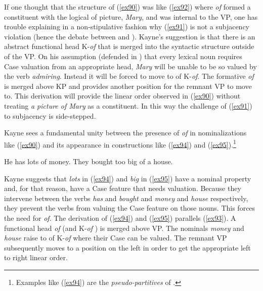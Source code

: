 \documentclass[output=paper,
modfonts
]{LSP/langsci}
\begin{document}
If one thought that the structure of ({\ref{ex90}}) was like ({\ref{ex92}}) where {\textit{of}} formed a constituent with the logical  of picture, {\textit{Mary}}, and was internal to the VP, one has trouble explaining in a non-stipulative fashion why ({\ref{ex91}}) is not a subjacency violation (hence the debate between {\citealt{Bach76}} and {\citealt{Chomsky77}}).  Kayne's suggestion is that there is an abstract functional head K-{\textit{of}} that is merged into the syntactic structure outside of the VP.  On his assumption (defended in {\citealt{Emonds2000}}) that every lexical noun requires Case valuation from an appropriate head, {\textit{Mary}} will be unable to be so valued by the verb {\textit{admiring}}.  Instead it will be forced to move to  of K-{\textit{of}}.  The formative {\textit{of}}  is merged above KP and provides another  position for the remnant VP to move to.  This derivation will provide the linear order observed in ({\ref{ex90}}) without treating {\textit{a picture of Mary}} as a constituent.  In this way the challenge of ({\ref{ex91}}) to subjacency is side-stepped.

Kayne sees a fundamental unity between the presence of {\textit{of}} in nominalizations like ({\ref{ex90}}) and its appearance in constructions like ({\ref{ex94}}) and ({\ref{ex95}}).{\footnote{Examples like ({\ref{ex94}}) are the {\textit{pseudo-partitives}} of {\citet{Selkirk77}}.}}

\begin{exe}
\ex\label{ex94}  He has lots of money.
\ex\label{ex95}  They bought too big of a house.
\end{exe}
Kayne suggests that {\textit{lots}} in ({\ref{ex94}}) and {\textit{big}} in ({\ref{ex95}}) have a nominal property and, for that reason, have a Case feature that needs valuation.   Because they intervene between the verbs {\textit{has}} and {\textit{bought}} and {\textit{money}} and {\textit{house}} respectively, they prevent the verbs from valuing the Case feature on those nouns.  This  forces the need for {\textit{of}}.  The derivation of ({\ref{ex94}}) and ({\ref{ex95}}) parallels ({\ref{ex93}}).  A functional head {\textit{of}} (and K-{\textit{of}} ) is merged above VP.  The nominals {\textit{money}} and {\textit{house}} raise to  of K-{\textit{of}} where their Case  can be valued.  The  remnant VP subsequently moves to a  position on the left in order to get the appropriate left to right linear order.
\end{document}
